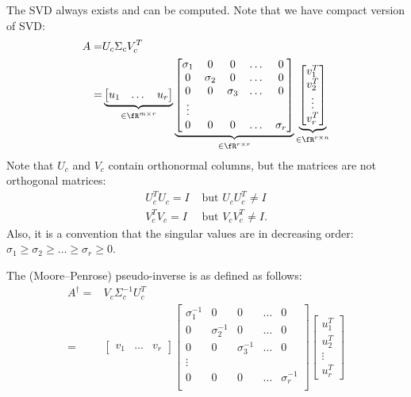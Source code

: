 \documentclass{article}
\begin{document}
The SVD always exists and can be computed.
Note that we have compact version of SVD:
\begin{align}
A =& U_c \Sigma_c V_c^T\\
=&\underbrace{\begin{bmatrix}u_1& \dots & u_r\end{bmatrix}}_{\in\fR^{m\times r}}
\underbrace{
 \begin{bmatrix}
 \sigma_1 & 0 & 0 & \dots & 0 \\
        0 & \sigma_2 & 0 & \dots & 0\\
        0 & 0 & \sigma_3 & \dots & 0\\
        \vdots &&&&\\
        0 & 0 & 0 & \dots & \sigma_r\\
 \end{bmatrix}}_{\in\fR^{r\times r}}
\underbrace{\begin{bmatrix}v_1^T \\ v_2^T\\\vdots \\v_r^T\end{bmatrix}}_{\in\fR^{r\times n}}
\end{align}
Note that $U_c$ and $V_c$ contain orthonormal columns, but the matrices are not orthogonal matrices:
\begin{align}
    U_c^TU_c = I &\mbox{ but }    U_cU_c^T \neq I \\
    V_c^TV_c = I &\mbox{ but }    V_cV_c^T \neq I .
\end{align}
Also, it is a convention that the singular values are in decreasing order: $\sigma_1\geq \sigma_2\geq\dots \geq\sigma_r\geq0$.

\begin{definition}
    The (Moore--Penrose) pseudo-inverse is as defined as follows:
    \begin{align}
        A^{\dagger} =& V_c \Sigma_c^{-1} U_c^T\\
=&\begin{bmatrix}v_1& \dots & v_r\end{bmatrix}
 \begin{bmatrix}
 \sigma_1^{-1} & 0 & 0 & \dots & 0 \\
        0 & \sigma_2^{-1} & 0 & \dots & 0\\
        0 & 0 & \sigma_3^{-1} & \dots & 0\\
        \vdots &&&&\\
        0 & 0 & 0 & \dots & \sigma_r^{-1}\\
 \end{bmatrix}
\begin{bmatrix}u_1^T \\ u_2^T\\\vdots \\u_r^T\end{bmatrix}
    \end{align}
\end{definition}
\end{document}
